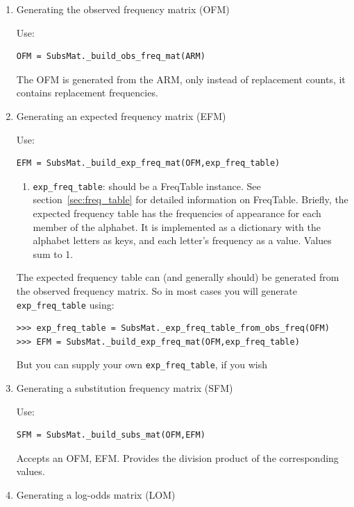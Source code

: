 \documentclass{report}
\begin{document}
\begin{enumerate}
\begin{enumerate}
\item Generating the observed frequency matrix (OFM)

Use:
\begin{verbatim}
OFM = SubsMat._build_obs_freq_mat(ARM)
\end{verbatim}

  The OFM is generated from the ARM, only instead of replacement counts, it contains replacement frequencies.

\item Generating an expected frequency matrix (EFM)

Use:

\begin{verbatim}
EFM = SubsMat._build_exp_freq_mat(OFM,exp_freq_table)
\end{verbatim}

  \begin{enumerate}
    \item \verb|exp_freq_table|: should be a FreqTable instance. See section~\ref{sec:freq_table} for detailed information on FreqTable. Briefly, the expected frequency table has the frequencies of appearance for each member of the alphabet. It is
  implemented as a dictionary with the alphabet letters as keys, and each letter's frequency as a value. Values sum to 1.
  \end{enumerate}

The expected frequency table can (and generally should) be generated from the observed frequency matrix. So in most cases you will generate \verb|exp_freq_table| using:

\begin{verbatim}
>>> exp_freq_table = SubsMat._exp_freq_table_from_obs_freq(OFM)
>>> EFM = SubsMat._build_exp_freq_mat(OFM,exp_freq_table)
\end{verbatim}

But you can supply your own \verb|exp_freq_table|, if you wish

\item Generating a substitution frequency matrix (SFM)

Use:

\begin{verbatim}
SFM = SubsMat._build_subs_mat(OFM,EFM)
\end{verbatim}

  Accepts an OFM, EFM. Provides the division product of the corresponding values.

\item Generating a log-odds matrix (LOM)


\end{enumerate}
\end{enumerate}
\end{document}
